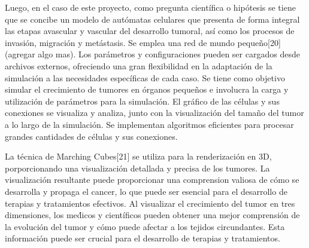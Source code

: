 \hspace{.1cm}Luego, en el caso de este proyecto, como pregunta científica o hip\'otesis se tiene que se concibe un modelo de autómatas celulares que presenta de forma integral las etapas avascular y vascular del desarrollo tumoral, así como los procesos de invasión, migración y metástasis. Se emplea una red de mundo pequeño[20](agregar algo mas). Los parámetros y configuraciones pueden ser cargados desde archivos externos, ofreciendo una gran flexibilidad en la adaptación de la simulación a las necesidades específicas de cada caso. Se tiene como objetivo simular el crecimiento de tumores en órganos pequeños e involucra la carga y utilización de parámetros para la simulación. El gráfico de las células y sus conexiones se visualiza y analiza, junto con la visualización del tamaño del tumor a lo largo de la simulación. Se implementan algoritmos eficientes para procesar grandes cantidades de células y sus conexiones.

\hspace{.1cm}La técnica de Marching Cubes[21] se utiliza para la renderizaci\'on en 3D, porporcionando una visualizaci\'on detallada y precisa de los tumores. La visualizaci\'on resultante puede proporcionar una comprension valiosa de cómo se desarrolla y propaga el cancer, lo que puede ser esencial para el desarrollo de terapias y tratamientos efectivos. Al visualizar el crecimiento del tumor en tres dimensiones, los me\'dicos y cient\'ificos pueden obtener una mejor comprensi\'on de la evoluci\'on del tumor y cómo puede afectar a los tejidos circundantes. Esta informaci\'on puede ser crucial para el desarrollo de terapias y tratamientos.


